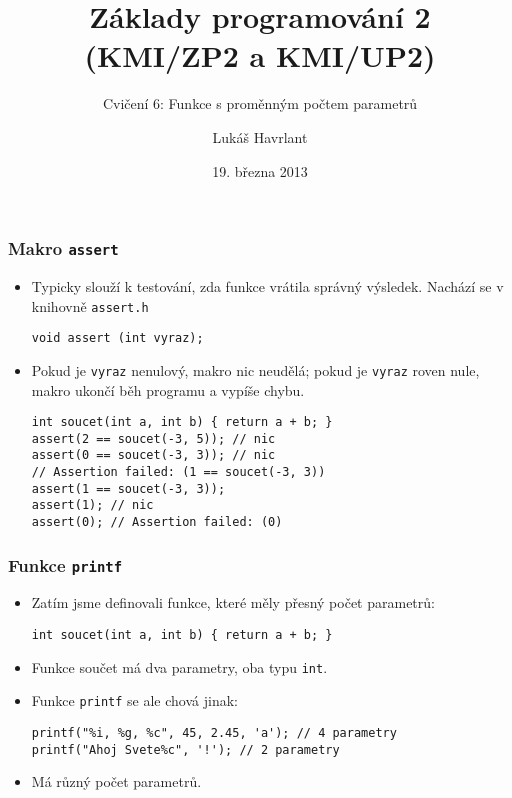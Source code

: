 \documentclass{beamer}
\title{Základy programování 2 (KMI/ZP2 a KMI/UP2)}
\subtitle{Cvičení 6: Funkce s proměnným počtem parametrů}
\author{Lukáš Havrlant}
\date{19. března 2013}
\institute{Univerzita Palackého}
\newenvironment{itemizex}%
  {\large \begin{itemize}%
    \setlength{\itemsep}{8pt}%
    \setlength{\parskip}{8pt}}%
  {\end{itemize}}
\begin{document}
\begin{frame}[t,plain]
\titlepage
\end{frame}


\begin{frame}[t,fragile]\frametitle{Makro \texttt{assert}} 
    \begin{itemize}
        \item Typicky slouží k testování, zda funkce vrátila správný výsledek. Nachází se v knihovně \texttt{assert.h}
\begin{verbatim} 
void assert (int vyraz);
\end{verbatim}
        \item Pokud je \texttt{vyraz} nenulový, makro nic neudělá; pokud je \texttt{vyraz} roven nule, makro ukončí běh programu a vypíše chybu.
\begin{verbatim} 
int soucet(int a, int b) { return a + b; }
assert(2 == soucet(-3, 5)); // nic
assert(0 == soucet(-3, 3)); // nic
// Assertion failed: (1 == soucet(-3, 3))
assert(1 == soucet(-3, 3));
assert(1); // nic
assert(0); // Assertion failed: (0)
\end{verbatim}
    \end{itemize}
\end{frame}


\begin{frame}[t,fragile]\frametitle{Funkce \texttt{printf}} 
    \begin{itemizex}
        \item Zatím jsme definovali funkce, které měly přesný počet parametrů:
\begin{verbatim} 
int soucet(int a, int b) { return a + b; }
\end{verbatim}
        \item Funkce součet má dva parametry, oba typu \texttt{int}.
        \item Funkce \texttt{printf} se ale chová jinak:
\begin{verbatim} 
printf("%i, %g, %c", 45, 2.45, 'a'); // 4 parametry
printf("Ahoj Svete%c", '!'); // 2 parametry
\end{verbatim}
        \item Má různý počet parametrů. 
    \end{itemizex}
\end{frame}
\end{document}
